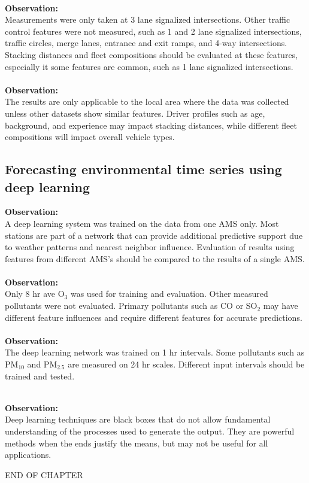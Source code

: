 \noindent\\
\textbf{Observation:}\\
Measurements were only taken at 3 lane signalized intersections. Other traffic control features were not measured, such as 1 and 2 lane signalized intersections, traffic circles, merge lanes, entrance and exit ramps, and 4-way intersections.  Stacking distances and fleet compositions should be evaluated at these features, especially it some features are common, such as 1 lane signalized intersections.\\

\noindent\\
\textbf{Observation:}\\
The results are only applicable to the local area where the data was collected unless other datasets show similar features. Driver profiles such as age, background, and experience may impact stacking distances, while different fleet compositions will impact overall vehicle types.

\subsection*{Forecasting environmental time series using deep learning}
\noindent
\textbf{Observation:}\\
A deep learning system was trained on the data from one AMS only. Most stations are part of a network that can provide additional predictive support due to weather patterns and nearest neighbor influence. Evaluation of results using features from different AMS's should be compared to the results of a single AMS.\\

\noindent\\
\textbf{Observation:}\\
Only 8 hr ave O$_{3}$ was used for training and evaluation. Other measured pollutants were not evaluated. Primary pollutants such as CO or SO$_{2}$  may have different feature influences and require different features for accurate predictions.\\

\noindent\\
\textbf{Observation:}\\
The deep learning network was trained on 1 hr intervals. Some pollutants such as PM$_{10}$ and PM$_{2.5}$ are measured on 24 hr scales. Different input intervals should be trained and tested.

\noindent\\
\textbf{Observation:}\\
Deep learning techniques are black boxes that do not allow fundamental understanding of the processes used to generate the output. They are powerful methods when the ends justify the means, but may not be useful for all applications.

\bigskip

\begin{center}
END OF CHAPTER
\end{center}